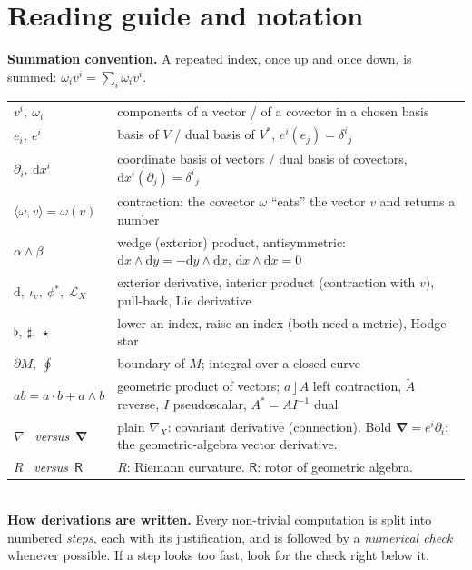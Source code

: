 \documentclass[11pt,a4paper]{article}
\numberwithin{equation}{section}
\theoremstyle{definition}
\theoremstyle{plain}
\newcommand{\dd}{\mathrm{d}}
\newcommand{\Lie}{\mathcal{L}}
\newcommand{\pb}{{}^{*}}                            %
\newcommand{\rev}[1]{\widetilde{#1}}
\newcommand{\lc}{\mathbin{\rfloor}}
\newcommand{\pss}{I}
\newcommand{\dual}[1]{#1^{\ast}}
\newcommand{\hodge}{\star}
\newcommand{\vd}{\boldsymbol{\nabla}}               %
\newcommand{\rotor}{\mathsf{R}}                     %
\begin{document}
\section*{Reading guide and notation}

\begin{keyidea}
\small
\textbf{Summation convention.} A repeated index, once up and once down, is summed:
$\omega_iv^i=\sum_i\omega_iv^i$.\\[2pt]
\begin{tabular}{@{}p{4.1cm}p{10.2cm}@{}}
$v^i,\ \omega_i$ & components of a vector / of a covector in a chosen basis\\
$e_i,\ e^i$ & basis of $V$ / dual basis of $V^*$, $e^i(e_j)=\delta^i{}_j$\\
$\partial_i,\ \dd x^i$ & coordinate basis of vectors / dual basis of covectors, $\dd x^i(\partial_j)=\delta^i{}_j$\\
$\langle\omega,v\rangle=\omega(v)$ & contraction: the covector $\omega$ ``eats'' the vector $v$ and returns a number\\
$\alpha\wedge\beta$ & wedge (exterior) product, antisymmetric: $\dd x\wedge\dd y=-\dd y\wedge\dd x$, $\dd x\wedge\dd x=0$\\
$\dd,\ \iota_v,\ \phi\pb,\ \Lie_X$ & exterior derivative, interior product (contraction with $v$), pull-back, Lie derivative\\
$\flat,\ \sharp,\ \hodge$ & lower an index, raise an index (both need a metric), Hodge star\\
$\partial M,\ \oint$ & boundary of $M$; integral over a closed curve\\
$ab=a\cdot b+a\wedge b$ & geometric product of vectors; $a\lc A$ left contraction, $\rev A$ reverse, $\pss$ pseudoscalar, $\dual A=A\pss^{-1}$ dual\\
$\nabla$ \ \textit{versus}\ $\vd$ & plain $\nabla_X$: covariant derivative (connection). Bold $\vd=e^i\partial_i$: the geometric-algebra vector derivative.\\
$R$ \ \textit{versus}\ $\rotor$ & $R$: Riemann curvature. $\rotor$: rotor of geometric algebra.
\end{tabular}\\[3pt]
\textbf{How derivations are written.} Every non-trivial computation is split into numbered
\emph{steps}, each with its justification, and is followed by a \emph{numerical check} whenever
possible. If a step looks too fast, look for the check right below it.
\end{keyidea}
\end{document}
